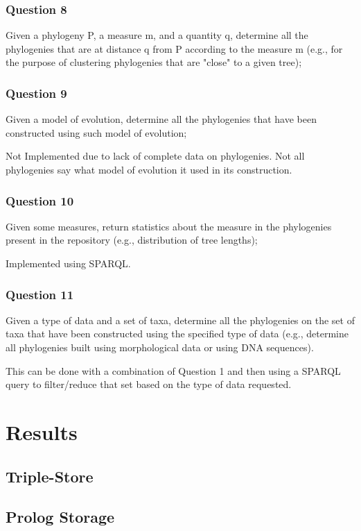 \documentclass[10pt]{article}
\begin{document}
\subsubsection{Question 8}
Given a phylogeny P, a measure m, and a quantity q, determine all the phylogenies that are at distance q from P according to the measure m (e.g., for the purpose of clustering phylogenies that are "close" to a given tree);

\subsubsection{Question 9}
Given a model of evolution, determine all the phylogenies that have been constructed using such model of evolution;


Not Implemented due to lack of complete data on phylogenies.  Not all phylogenies say what model of evolution it used in its construction.

\subsubsection{Question 10}
Given some measures, return statistics about the measure in the phylogenies present in the repository (e.g., distribution of tree lengths);


Implemented using SPARQL.

\subsubsection{Question 11}
Given a type of data and a set of taxa, determine all the phylogenies on the set of taxa that have been constructed using the specified type of data (e.g., determine all phylogenies built using morphological data or using DNA sequences).	


This can be done with a combination of Question 1 and then using a SPARQL query to filter/reduce that set based on the type of data requested.

\section{Results}

\subsection{Triple-Store}

\subsection{Prolog Storage}
\end{document}
